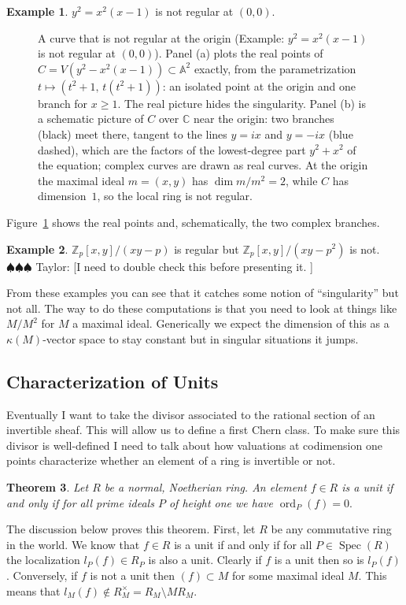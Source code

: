 \documentclass[12pt]{article}
\numberwithin{equation}{section}
\newtheorem{theorem}{Theorem}[subsection]
\theoremstyle{definition}
\newtheorem{example}[theorem]{Example}
\theoremstyle{remark}
\newcommand{\CC}{\mathbb{C}}
\newcommand{\ZZ}{\mathbb{Z}}
\renewcommand{\AA}{\mathbb{A}}
\newcommand{\Spec}{\operatorname{Spec}}
\newcommand{\ord}{\operatorname{ord}}
\newcommand{\taylor}[1]{{\color{blue} \sf $\spadesuit\spadesuit\spadesuit$ Taylor: [#1]}}
\begin{document}
\begin{example}
	$y^2=x^2(x-1)$ is not regular at $(0,0)$.
\begin{figure}[H]
\centering

\caption{A curve that is not regular at the origin (Example: $y^2=x^2(x-1)$ is not regular at $(0,0)$). Panel (a) plots the real points of $C=V(y^2-x^2(x-1))\subset\AA^2$ exactly, from the parametrization $t\mapsto(t^2+1,\,t(t^2+1))$: an isolated point at the origin and one branch for $x\ge1$. The real picture hides the singularity. Panel (b) is a schematic picture of $C$ over $\CC$ near the origin: two branches (black) meet there, tangent to the lines $y=ix$ and $y=-ix$ (blue dashed), which are the factors of the lowest-degree part $y^2+x^2$ of the equation; complex curves are drawn as real curves. At the origin the maximal ideal $m=(x,y)$ has $\dim m/m^2=2$, while $C$ has dimension~$1$, so the local ring is not regular.}\label{fig:isolated-node}
\end{figure}
Figure~\ref{fig:isolated-node} shows the real points and, schematically, the two complex branches.

\end{example}

\begin{example}
	$\ZZ_p[x,y]/(xy-p)$ is regular but $\ZZ_p[x,y]/(xy-p^2)$ is not. \taylor{I need to double check this before presenting it. }
\end{example}

From these examples you can see that it catches some notion of ``singularity'' but not all. The way to do these computations is that you need to look at things like $M/M^2$ for $M$ a maximal ideal. 
Generically we expect the dimension of this as a $\kappa(M)$-vector space to stay constant but in singular situations it jumps.

\subsection{Characterization of Units}
Eventually I want to take the divisor associated to the rational section of an invertible sheaf. 
This will allow us to define a first Chern class. 
To make sure this divisor is well-defined I need to talk about how valuations at codimension one points characterize whether an element of a ring is invertible or not.

\begin{theorem}
	Let $R$ be a normal, Noetherian ring. 
	An element $f \in R$ is a unit if and only if for all prime ideals $P$ of height one we have $\ord_P(f)=0.$
\end{theorem}
The discussion below proves this theorem.
First, let $R$ be any commutative ring in the world. 
We know that $f\in R$ is a unit if and only if for all $P\in \Spec(R)$ the localization $l_P(f) \in R_P$ is also a unit. 
Clearly if $f$ is a unit then so is $l_P(f)$. 
Conversely, if $f$ is not a unit then $(f) \subset M$ for some maximal ideal $M$.
This means that $l_M(f) \notin R_M^{\times} = R_M\setminus MR_M$.
\end{document}
